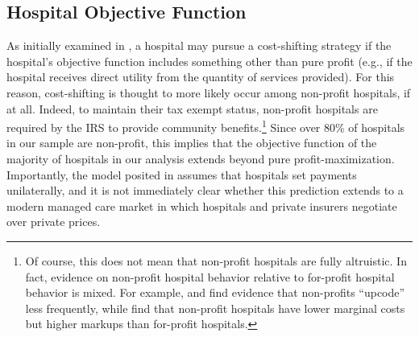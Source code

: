 \documentclass[12pt]{article}
\begin{document}
\subsection{Hospital Objective Function}
As initially examined in \cite{dranove1988}, a hospital may pursue a cost-shifting strategy if the hospital's objective function includes something other than pure profit (e.g., if the hospital receives direct utility from the quantity of services provided). For this reason, cost-shifting is thought to more likely occur among non-profit hospitals, if at all. Indeed, to maintain their tax exempt status, non-profit hospitals are required by the IRS to provide community benefits.\footnote{Of course, this does not mean that non-profit hospitals are fully altruistic. In fact, evidence on non-profit hospital behavior relative to for-profit hospital behavior is mixed. For example, \cite{silverman2004} and \cite{dafny2005} find evidence that non-profits ``upcode'' less frequently, while \cite{gaynor2003} find that non-profit hospitals have lower marginal costs but higher markups than for-profit hospitals.} Since over 80\% of hospitals in our sample are non-profit, this implies that the objective function of the majority of hospitals in our analysis extends beyond pure profit-maximization.  Importantly, the model posited in \cite{dranove1988} assumes that hospitals set payments unilaterally, and it is not immediately clear whether this prediction extends to a modern managed care market in which hospitals and private insurers negotiate over private prices.
\end{document}
